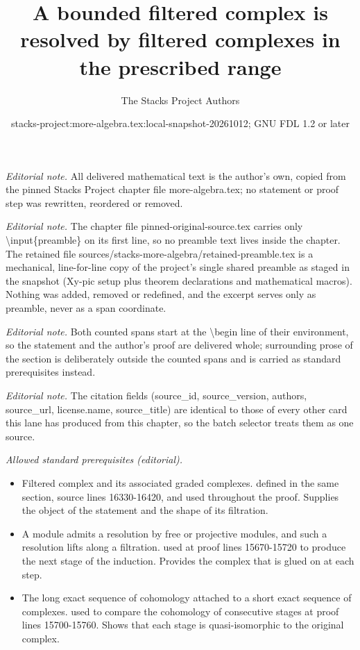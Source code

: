 \documentclass[10pt,a4paper]{amsart}
\title{A bounded filtered complex is resolved by filtered complexes in the prescribed range}
\author{The Stacks Project Authors}
\date{stacks-project:more-algebra.tex:local-snapshot-20261012; GNU FDL 1.2 or later}
\theoremstyle{plain}
\theoremstyle{definition}
\theoremstyle{remark}
\numberwithin{equation}{subsection}
\begin{document}
\maketitle
\setcounter{subsection}{1}
\noindent\textit{Editorial note.} All delivered mathematical text is the author's own, copied from the pinned Stacks Project chapter file more-algebra.tex; no statement or proof step was rewritten, reordered or removed.\par\medskip
\noindent\textit{Editorial note.} The chapter file pinned-original-source.tex carries only \textbackslash{}input\{preamble\} on its first line, so no preamble text lives inside the chapter. The retained file sources/stacks-more-algebra/retained-preamble.tex is a mechanical, line-for-line copy of the project's single shared preamble as staged in the snapshot (Xy-pic setup plus theorem declarations and mathematical macros). Nothing was added, removed or redefined, and the excerpt serves only as preamble, never as a span coordinate.\par\medskip
\noindent\textit{Editorial note.} Both counted spans start at the \textbackslash{}begin line of their environment, so the statement and the author's proof are delivered whole; surrounding prose of the section is deliberately outside the counted spans and is carried as standard prerequisites instead.\par\medskip
\noindent\textit{Editorial note.} The citation fields (source\_id, source\_version, authors, source\_url, license.name, source\_title) are identical to those of every other card this lane has produced from this chapter, so the batch selector treats them as one source.\par\medskip
\noindent\textit{Allowed standard prerequisites (editorial).}\begin{itemize}
\item Filtered complex and its associated graded complexes. defined in the same section, source lines 16330-16420, and used throughout the proof. Supplies the object of the statement and the shape of its filtration.
\item A module admits a resolution by free or projective modules, and such a resolution lifts along a filtration. used at proof lines 15670-15720 to produce the next stage of the induction. Provides the complex that is glued on at each step.
\item The long exact sequence of cohomology attached to a short exact sequence of complexes. used to compare the cohomology of consecutive stages at proof lines 15700-15760. Shows that each stage is quasi-isomorphic to the original complex.
\end{itemize}\medskip
\end{document}

